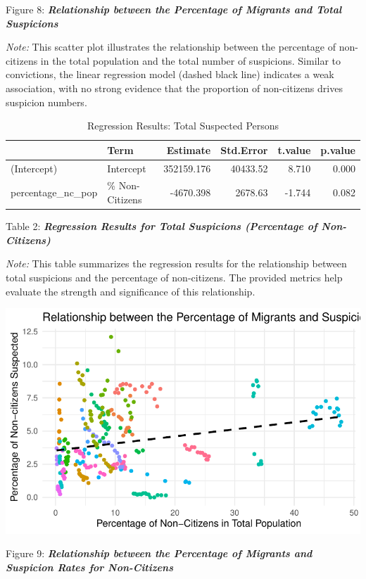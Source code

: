 \documentclass[
]{article}
\begin{document}
Figure 8: \textbf{\emph{Relationship between the Percentage of Migrants
and Total Suspicions}}

\emph{Note:} This scatter plot illustrates the relationship between the
percentage of non-citizens in the total population and the total number
of suspicions. Similar to convictions, the linear regression model
(dashed black line) indicates a weak association, with no strong
evidence that the proportion of non-citizens drives suspicion numbers.

\begin{table}
\centering
\caption{Regression Results: Total Suspected Persons}
\centering
\begin{tabular}[t]{l|l|r|r|r|r}
\hline
  & Term & Estimate & Std.Error & t.value & p.value\\
\hline
(Intercept) & Intercept & 352159.176 & 40433.52 & 8.710 & 0.000\\
\hline
percentage\_nc\_pop & \% Non-Citizens & -4670.398 & 2678.63 & -1.744 & 0.082\\
\hline
\end{tabular}
\end{table}

Table 2: \textbf{\emph{Regression Results for Total Suspicions
(Percentage of Non-Citizens)}}

\emph{Note:} This table summarizes the regression results for the
relationship between total suspicions and the percentage of
non-citizens. The provided metrics help evaluate the strength and
significance of this relationship.

\includegraphics{DataMan_Project_files/figure-pdf/unnamed-chunk-36-1.pdf}

Figure 9: \textbf{\emph{Relationship between the Percentage of Migrants
and Suspicion Rates for Non-Citizens}}
\end{document}
